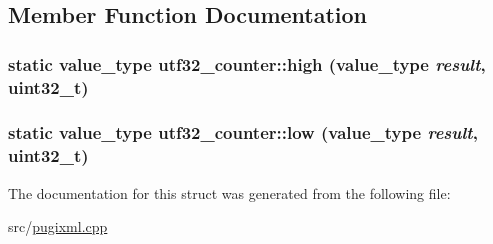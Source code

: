 \subsection{Member Function Documentation}
\hypertarget{structutf32__counter_aa72f5248b1dc5937330ab049bf449251}{
\subsubsection[{high}]{\setlength{\rightskip}{0pt plus 5cm}static {\bf value\_\-type} utf32\_\-counter::high ({\bf value\_\-type} {\em result}, \/  uint32\_\-t)}}
\label{structutf32__counter_aa72f5248b1dc5937330ab049bf449251}
\hypertarget{structutf32__counter_a3a75f4840e0391ed972ddba621d49480}{
\subsubsection[{low}]{\setlength{\rightskip}{0pt plus 5cm}static {\bf value\_\-type} utf32\_\-counter::low ({\bf value\_\-type} {\em result}, \/  uint32\_\-t)}}
\label{structutf32__counter_a3a75f4840e0391ed972ddba621d49480}


The documentation for this struct was generated from the following file:\begin{DoxyCompactItemize}
\item 
src/\hyperlink{pugixml_8cpp}{pugixml.cpp}\end{DoxyCompactItemize}
